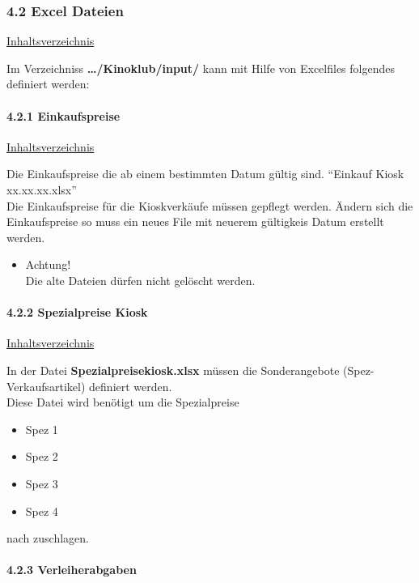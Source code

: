 \documentclass[
]{article}
\providecommand{\tightlist}{%
  \setlength{\itemsep}{0pt}\setlength{\parskip}{0pt}}
\begin{document}
\subsubsection{4.2 Excel Dateien}\label{excel-dateien}

\hyperref[Inhaltsverzeichnis]{Inhaltsverzeichnis}

Im Verzeichniss \textbf{\ldots/Kinoklub/input/} kann mit Hilfe von
Excelfiles folgendes definiert werden:

\paragraph{4.2.1 Einkaufspreise}\label{einkaufspreise}

\hyperref[Inhaltsverzeichnis]{Inhaltsverzeichnis}

Die Einkaufspreise die ab einem bestimmten Datum gültig sind. ``Einkauf
Kiosk xx.xx.xx.xlsx''\\
Die Einkaufspreise für die Kioskverkäufe müssen gepflegt werden. Ändern
sich die Einkaufspreise so muss ein neues File mit neuerem gültigkeis
Datum erstellt werden.\\

\begin{itemize}
\tightlist
\item
  Achtung!\\
  Die alte Dateien dürfen nicht gelöscht werden.
\end{itemize}

\paragraph{4.2.2 Spezialpreise Kiosk}\label{spezialpreise-kiosk}

\hyperref[Inhaltsverzeichnis]{Inhaltsverzeichnis}

In der Datei \textbf{Spezialpreisekiosk.xlsx} müssen die Sonderangebote
(Spez-Verkaufsartikel) definiert werden.\\
Diese Datei wird benötigt um die Spezialpreise

\begin{itemize}
\tightlist
\item
  Spez 1
\item
  Spez 2
\item
  Spez 3
\item
  Spez 4
\end{itemize}

nach zuschlagen.

\paragraph{4.2.3 Verleiherabgaben}\label{verleiherabgaben}
\end{document}
